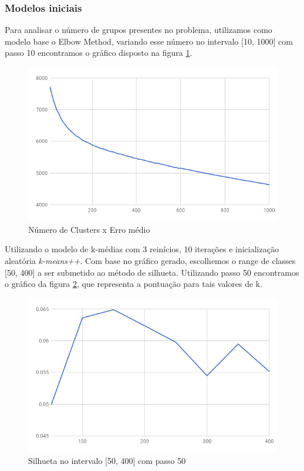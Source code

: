 \documentclass[conference]{IEEEtran}
\begin{document}
\subsubsection{Modelos iniciais}
Para analisar o número de grupos presentes no problema, utilizamos como modelo base o Elbow Method, variando esse número no intervalo [10, 1000] com passo 10 encontramos o gráfico disposto na figura \ref{fig:elbow}. 

\begin{figure}[H]
  \includegraphics[scale=0.4, center]{elbow.png}
  \caption{Número de Clusters x Erro médio}
  \label{fig:elbow}
\end{figure}

Utilizando o modelo de k-médias com 3 reinícios, 10 iterações e inicialização aleatória \textit{k-means++}. Com base no gráfico gerado, escolhemos o range de classes [50, 400] a ser submetido ao método de silhueta. Utilizando passo 50 encontramos o gráfico da figura \ref{fig:sil1}, que representa a pontuação para tais valores de k.

\begin{figure}[H]
  \includegraphics[scale=0.4, center]{silhouette1.png}
  \caption{Silhueta no intervalo [50, 400] com passo 50}
  \label{fig:sil1}
\end{figure}
\end{document}
